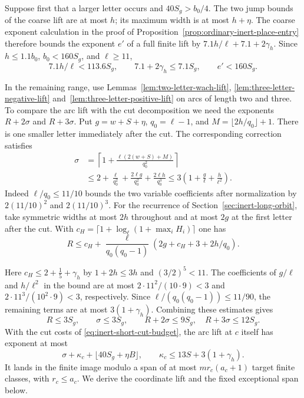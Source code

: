 Suppose first that a larger letter occurs and \(40S_g>b_0/4\).
The two jump bounds of the coarse lift are at most \(h\); its
maximum width is at most \(h+\eta\). The coarse exponent calculation
in the proof of Proposition~\ref{prop:ordinary-inert-place-entry}
therefore bounds the exponent \(e'\) of a full finite lift by
\(7.1 h/\ell+7.1+2\gamma_h\). Since \(h\le1.1b_0\),
\(b_0<160S_g\), and \(\ell\ge11\),
\[
 7.1 h/\ell <113.6 S_g,\qquad
 7.1+2\gamma_h\le7.1S_g,\qquad e'<160 S_g .
\]

In the remaining range, use Lemmas~\ref{lem:two-letter-wach-lift},
\ref{lem:three-letter-negative-lift} and~\ref{lem:three-letter-positive-lift}
on arcs of length two and three. To compare the arc lift with the cut
decomposition we need the exponents \(R+2\sigma\) and \(R+3\sigma\).
Put \(g=w+S+\eta\), \(q_0=\ell-1\), and
\(M=\lfloor2h/q_0\rfloor+1\). There is one smaller letter
immediately after the cut. The corresponding correction satisfies
\[
 \begin{aligned}
 \sigma
 &=\left\lceil1+\frac{\ell(2(w+S)+M)}{q_0^2}\right\rceil\\
 &\le 2+\frac{\ell}{q_0^2}
       +\frac{2\ell g}{q_0^2}+\frac{2\ell h}{q_0^3}
 \le 3\left(1+\frac{g}{\ell}+\frac{h}{\ell^2}\right).
 \end{aligned}
\]
Indeed \(\ell/q_0\le11/10\) bounds the two variable coefficients
after normalization by \(2(11/10)^2\) and \(2(11/10)^3\).
For the recurrence of Section~\ref{sec:inert-long-orbit}, take
symmetric widths at most \(2h\) throughout and at most \(2g\)
at the first letter after the cut. With
\(c_H=\lceil1+\log_\ell(1+\max_i H_i)\rceil\) one has
\[
 R\le c_H + \frac{\ell}{q_0(q_0-1)}
                    (2g+c_H+3+2h/q_0).
\]

Here \(c_H\le 2+\tfrac15+\gamma_h\) by
\(1+2h\le3h\) and \((3/2)^5<11\).
The coefficients of \(g/\ell\) and \(h/\ell^2\) in the bound
are at most \(2\cdot11^2/(10\cdot9)<3\) and
\(2\cdot11^3/(10^2\cdot9)<3\), respectively. Since
\(\ell/(q_0(q_0-1))\le11/90\), the remaining terms
are at most \(3(1+\gamma_h)\). Combining these estimates gives
\begin{equation}\label{eq:inert-short-cut-budget}
 R\le3S_g,\qquad \sigma\le3S_g,\qquad
 R+2\sigma\le9S_g,\quad R+3\sigma\le12S_g .
\end{equation}
With the cut costs of \eqref{eq:inert-short-cut-budget}, the arc lift at \(c\) itself has exponent at most
\[
 \sigma+\kappa_c+\lfloor 40S_g+\eta B\rfloor ,
 \qquad
 \kappa_c\le 13S+3(1+\gamma_h).
\]
It lands in the finite image modulo a span of at most
\(m r_c(a_c+1)\) target finite classes, with \(r_c\le a_c\).
We derive the coordinate lift and the fixed exceptional span below.

